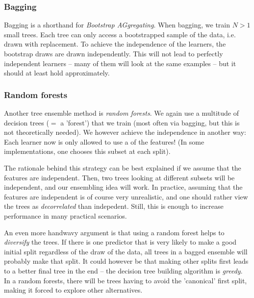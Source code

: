 \documentclass{article}
\begin{document}
\subsubsection{Bagging}
Bagging is a shorthand for \emph{Bootstrap AGgregating}. When bagging, we train $N>1$ small trees. Each tree can only access a bootstrapped sample of the data, i.e. drawn with replacement. To achieve the independence of the learners, the bootstrap draws are drawn independently. This will not lead to perfectly independent learners -- many of them will look at the same examples -- but it should at least hold approximately.


\subsubsection{Random forests} Another tree ensemble method is \emph{random forests}. We again use a multitude of decision trees ($=$ a 'forest') that we train (most often via bagging, but this is not theoretically needed). We however achieve the independence in another way: Each learner now is only allowed to use a  of the features! (In some implementations, one chooses this subset at each split).

The rationale behind this strategy can be best explained if we assume that the features are independent. Then, two trees looking at different subsets will be independent, and our ensembling idea will work. In practice, assuming that the features  are independent is of course very unrealistic, and one should rather view the trees as \emph{decorrelated} than indepedent. Still, this is enough to increase performance in many practical scenarios.  

An even more handwavy argument is that using a random forest helps to \emph{diversify} the trees. If there is one predictor that is very likely to make a good initial split regardless of the draw of the data, all trees in a bagged ensemble will probably make that split. It could however be that making other splits first leads to a better final tree in the end -- the decision tree building algorithm is \emph{greedy}. In a random forests, there will be trees having to avoid the 'canonical' first split, making it forced to explore other alternatives.
\end{document}
